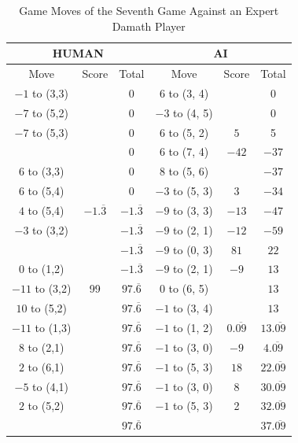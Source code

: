 \begin{appendices}
\begin{table}[H]
    \centering
    \begin{tabular}{cccccc}
        \hline
        \multicolumn{3}{c}{HUMAN}        & \multicolumn{3}{c}{AI}     \\ \hline
        Move         & Score & Total & Move          & Score & Total \\ \hline
         $-1$ to (3,3) &       &  0    &   6 to (3, 4) &       &  0    \\ \hline
         $-7$ to (5,2) &       &  0    &   $-3$ to (4, 5) &       &  0    \\ \hline
         $-7$ to (5,3) &       &  0    &   $6$ to (5, 2) & $5$    &  5    \\ \hline
                       &       &  0    &   $6$ to (7, 4) & $-42$    &  $-37$  \\ \hline
         $6$ to (3,3)  &       &  0    &   $8$ to (5, 6) &        &  $-37$    \\ \hline
         $6$ to (5,4)  &       &  0    &   $-3$ to (5, 3) & $3$    &  $-34$    \\ \hline
         $4$ to (5,4)  & $-1.\overline3$ &  $-1.\overline3$   &   $-9$ to (3, 3) & $-13$    &  $-47$    \\ \hline
         $-3$ to (3,2)  &       &  $-1.\overline3$    &   $-9$ to (2, 1) & $-12$    &  $-59$    \\ \hline
                        &       &  $-1.\overline3$    &   $-9$ to (0, 3) & $81$    &  $22$    \\ \hline
         $0$ to (1,2)  &       &  $-1.\overline3$     &   $-9$ to (2, 1) & $-9$    &  $13$    \\ \hline
         $-11$ to (3,2)  &   99 &  $97.\overline6$     &   $0$ to (6, 5) &         &  $13$    \\ \hline
         $10$ to (5,2)  &       &  $97.\overline6$     &   $-1$ to (3, 4) &         &  $13$    \\ \hline
         $-11$ to (1,3)  &       &  $97.\overline6$     &   $-1$ to (1, 2) & $0.\overline{09}$ &  $13.\overline{09}$    \\ \hline
         $8$ to (2,1)  &       &  $97.\overline6$     &   $-1$ to (3, 0) & $-9$ &  $4.\overline{09}$    \\ \hline
         $2$ to (6,1)  &       &  $97.\overline6$     &   $-1$ to (5, 3) & $18$ &  $22.\overline{09}$    \\ \hline
         $-5$ to (4,1)  &       &  $97.\overline6$     &   $-1$ to (3, 0) & 8 &  $30.\overline{09}$    \\ \hline
         $2$ to (5,2)  &        &  $97.\overline6$     &   $-1$ to (5, 3) & 2 &  $32.\overline{09}$    \\ \hline \hline
                       &        &  $97.\overline6$     &                  &   &  $37.\overline{09}$    \\ \hline
    \end{tabular}
    \caption{Game Moves of the Seventh Game Against an Expert Damath Player}
    \label{tab:seventh-game}
\end{table}


\end{appendices}
